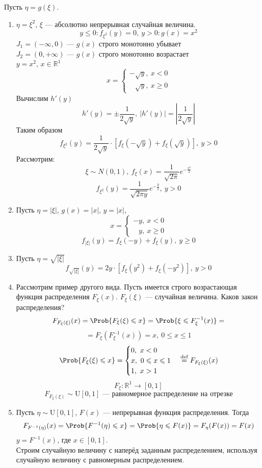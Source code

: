 \begin{example}
	Пусть $\eta = g(\xi)$.
\begin{enumerate}
	\item $\eta = \xi^2$, $\xi$ --- абсолютно непрерывная случайная величина.
	\[
		y \leqslant 0: f_{\xi^2} (y) = 0, \ y > 0 : g(x) = x^2
	\]
	$J_1 = (-\infty, 0)$ --- $g(x)$ строго монотонно убывает \\
	$J_2 = (0, +\infty)$ --- $g(x)$ строго монотонно возрастает\\
	$y = x^2$, $x \in \mathbb{R}^1$
	\[
		x = \begin{cases}
		-\sqrt{y}, \ x < 0 \\
		\;\;\:\sqrt{y}, \ x \geqslant 0 
		\end{cases}
	\]
	Вычислим $h'(y)$
	\[
		h'(y) = \pm \frac{1}{2\sqrt{y}}, \ | h'(y) | = \left| \frac{1}{2\sqrt{y}} \right|
	\]
	Таким образом
	\[
		f_{\xi^2} (y) = \frac{1}{2 \sqrt{y}} \cdot \left[ f_{\xi} (-\sqrt{y}) + f_{\xi} (\sqrt{y}) \right], \ y > 0
	\]
	Рассмотрим:
	\[
		\xi \sim N(0, 1), \ f_{\xi} (x) = \frac{1}{\sqrt{2\pi}} e^{-\frac{x^2}{2}}
	\]
	\[
		f_{\xi^2} (y) = \frac{1}{\sqrt{2 \pi y}} e^{- \frac{y}{2}}, \ y > 0
	\]
	\item Пусть $\eta = |\xi|$, $g(x) = |x|$, $y = |x|$,
	\[
		x = \begin{cases}
		-y, \ x < 0 \\
		\;\;\:y,\ x \geqslant 0
		\end{cases}
	\]
	\[
		f_{|\xi|} (y) = f_{\xi} (-y) + f_{\xi} (y), \ y \geqslant 0
	\]
	
	\item Пусть $\eta = \sqrt{|\xi|}$
	\[
		f_{\sqrt{|\xi|}} (y) = 2y \cdot \left[ f_{\xi} (y^2) + f_{\xi} (-y^2) \right], \ y > 0
	\]
	
	\item Рассмотрим пример другого вида. Пусть имеется строго возрастающая функция распределения $F_{\xi} (x)$.  $F_{\xi} (\xi)$ --- случайная величина. Каков закон распределения?
	\[
		F_{F_{\xi}(\xi)} (x) = \Prob \{ F_{\xi} (\xi) \leqslant x \} = \Prob \{ \xi \leqslant F_{\xi}^{-1} (x) \} =
	\]
	\[
		= F_{\xi} (F_{\xi}^{-1} (x)) = x, \ 0 \leqslant x \leqslant 1
	\]
	\[
		\Prob \{ F_{\xi} (\xi) \leqslant x \} = \begin{cases}
			0, \ x < 0 \\
			x, \ 0 \leqslant x \leqslant 1 \\
			1, \ x > 1
		\end{cases} \overset{\textrm{def}}{=} F_{F_{\xi}(\xi)} (x)
	\]
	\[
		F_{\xi} : \mathbb{R}^1 \to [0, 1]
	\]
	\[
		F_{F_{\xi}(\xi)} \sim \textrm{U} [0, 1] \text{ --- равномерное распределение на отрезке}
	\]

	\item Пусть $\eta \sim \textrm{U} [0, 1]$, $F(x)$ --- непрерывная функция распределения. Тогда
	\[
		F_{F^{-1}(\eta)} (x) = \Prob \{ F^{-1} (\eta) \leqslant x \} = \Prob \{ \eta \leqslant F(x) \} = F_{\eta} (F(x)) = F(x)
	\]
	$y = F^{-1} (x)$, где $x \in [0, 1]$. \\
	Строим случайную величину с наперёд заданным распределением, используя случайную величину с равномерным распределением. \\
\end{enumerate}
\end{example}
